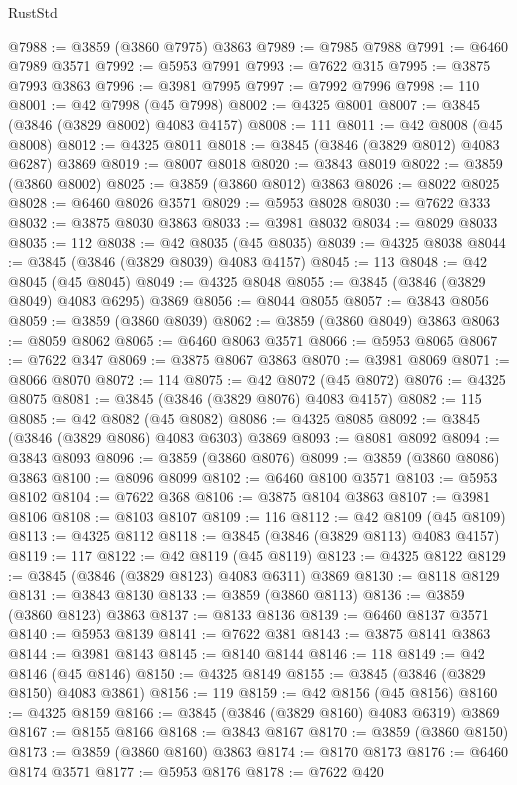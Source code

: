 \begin{lexlean}{RustStd}
\begin{coremodule}
@7988 := @3859 (@3860 @7975) @3863
@7989 := @7985 @7988
@7991 := @6460 @7989 @3571
@7992 := @5953 @7991
@7993 := @7622 @315
@7995 := @3875 @7993 @3863
@7996 := @3981 @7995
@7997 := @7992 @7996
@7998 := 110
@8001 := @42 @7998 (@45 @7998)
@8002 := @4325 @8001
@8007 := @3845 (@3846 (@3829 @8002) @4083 @4157)
@8008 := 111
@8011 := @42 @8008 (@45 @8008)
@8012 := @4325 @8011
@8018 := @3845 (@3846 (@3829 @8012) @4083 @6287) @3869
@8019 := @8007 @8018
@8020 := @3843 @8019
@8022 := @3859 (@3860 @8002)
@8025 := @3859 (@3860 @8012) @3863
@8026 := @8022 @8025
@8028 := @6460 @8026 @3571
@8029 := @5953 @8028
@8030 := @7622 @333
@8032 := @3875 @8030 @3863
@8033 := @3981 @8032
@8034 := @8029 @8033
@8035 := 112
@8038 := @42 @8035 (@45 @8035)
@8039 := @4325 @8038
@8044 := @3845 (@3846 (@3829 @8039) @4083 @4157)
@8045 := 113
@8048 := @42 @8045 (@45 @8045)
@8049 := @4325 @8048
@8055 := @3845 (@3846 (@3829 @8049) @4083 @6295) @3869
@8056 := @8044 @8055
@8057 := @3843 @8056
@8059 := @3859 (@3860 @8039)
@8062 := @3859 (@3860 @8049) @3863
@8063 := @8059 @8062
@8065 := @6460 @8063 @3571
@8066 := @5953 @8065
@8067 := @7622 @347
@8069 := @3875 @8067 @3863
@8070 := @3981 @8069
@8071 := @8066 @8070
@8072 := 114
@8075 := @42 @8072 (@45 @8072)
@8076 := @4325 @8075
@8081 := @3845 (@3846 (@3829 @8076) @4083 @4157)
@8082 := 115
@8085 := @42 @8082 (@45 @8082)
@8086 := @4325 @8085
@8092 := @3845 (@3846 (@3829 @8086) @4083 @6303) @3869
@8093 := @8081 @8092
@8094 := @3843 @8093
@8096 := @3859 (@3860 @8076)
@8099 := @3859 (@3860 @8086) @3863
@8100 := @8096 @8099
@8102 := @6460 @8100 @3571
@8103 := @5953 @8102
@8104 := @7622 @368
@8106 := @3875 @8104 @3863
@8107 := @3981 @8106
@8108 := @8103 @8107
@8109 := 116
@8112 := @42 @8109 (@45 @8109)
@8113 := @4325 @8112
@8118 := @3845 (@3846 (@3829 @8113) @4083 @4157)
@8119 := 117
@8122 := @42 @8119 (@45 @8119)
@8123 := @4325 @8122
@8129 := @3845 (@3846 (@3829 @8123) @4083 @6311) @3869
@8130 := @8118 @8129
@8131 := @3843 @8130
@8133 := @3859 (@3860 @8113)
@8136 := @3859 (@3860 @8123) @3863
@8137 := @8133 @8136
@8139 := @6460 @8137 @3571
@8140 := @5953 @8139
@8141 := @7622 @381
@8143 := @3875 @8141 @3863
@8144 := @3981 @8143
@8145 := @8140 @8144
@8146 := 118
@8149 := @42 @8146 (@45 @8146)
@8150 := @4325 @8149
@8155 := @3845 (@3846 (@3829 @8150) @4083 @3861)
@8156 := 119
@8159 := @42 @8156 (@45 @8156)
@8160 := @4325 @8159
@8166 := @3845 (@3846 (@3829 @8160) @4083 @6319) @3869
@8167 := @8155 @8166
@8168 := @3843 @8167
@8170 := @3859 (@3860 @8150)
@8173 := @3859 (@3860 @8160) @3863
@8174 := @8170 @8173
@8176 := @6460 @8174 @3571
@8177 := @5953 @8176
@8178 := @7622 @420

\end{coremodule}
\end{lexlean}

